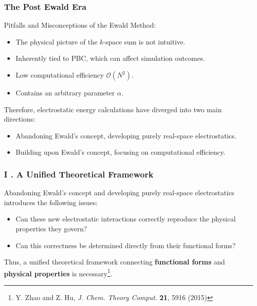 \documentclass{beamer}
\begin{document}
	\begin{frame}
		\frametitle{ The Post Ewald Era}		
		\small 
		
		Pitfalls and Misconceptions of the Ewald Method:
		
		\begin{itemize}
			\item The physical picture of the $k$-space sum is not intuitive.
			\item Inherently tied to PBC, which can affect simulation outcomes.
			\item Low computational efficiency $\mathscr{O}(N^2)$.
			\item Contains an arbitrary parameter $\alpha$.
		\end{itemize}
		
		\vspace{0.8cm}
		
		Therefore, electrostatic energy calculations have diverged into two main directions:
		
		\begin{itemize} 
			\item Abandoning Ewald's concept, developing purely real-space electrostatics.
			\item Building upon Ewald's concept, focusing on computational efficiency.
		\end{itemize}
		
		
	\end{frame}
	
	
	
	\begin{frame}
		\frametitle{ I .  A Unified Theoretical Framework}		
		
		
		Abandoning Ewald's concept and developing purely real-space electrostatics introduces the following issues:
		\vspace{0.6cm}
		
		\begin{itemize} 
			\item Can these new electrostatic interactions correctly reproduce the physical properties they govern? 
			\vspace{0.3cm}
			\item Can this correctness be determined directly from their functional forms?
		\end{itemize}
		
		\vspace{0.6cm}
		Thus, a unified  theoretical framework connecting \textbf{functional forms} and \textbf{physical properties} is necessary\footnote{Y. Zhao and Z. Hu, \textit{J. Chem. Theory Comput.} \textbf{21}, 5916 (2015)}.
	\end{frame}
\end{document}
